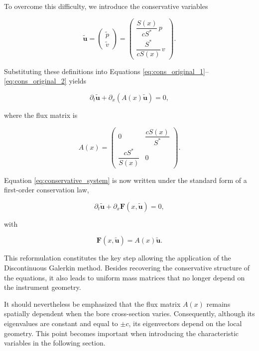 \documentclass[11pt,a4paper]{report}
\theoremstyle{plain}
\theoremstyle{definition}
\begin{document}
To overcome this difficulty, we introduce the conservative variables

\begin{equation}
\tilde{\mathbf{u}}
=
\begin{pmatrix}
\tilde p \\
\tilde v
\end{pmatrix}
=
\begin{pmatrix}
\dfrac{S(x)}{cS^\ast}\,p \\
\dfrac{S^\ast}{cS(x)}\,v
\end{pmatrix}.
\label{eq:conservative_variables}
\end{equation}

Substituting these definitions into Equations
\eqref{eq:cons_original_1}--\eqref{eq:cons_original_2} yields

\begin{equation}
\partial_t \tilde{\mathbf{u}}
+
\partial_x
\left(
A(x)\tilde{\mathbf{u}}
\right)
=
0,
\label{eq:conservative_system}
\end{equation}

where the flux matrix is

\begin{equation}
A(x)
=
\begin{pmatrix}
0 &
\dfrac{cS(x)}{S^\ast}
\\[0.4em]
\dfrac{cS^\ast}{S(x)}
&
0
\end{pmatrix}.
\label{eq:flux_matrix}
\end{equation}

Equation \eqref{eq:conservative_system} is now written under the standard form
of a first-order conservation law,

\begin{equation}
\partial_t\tilde{\mathbf u}
+
\partial_x
\mathbf F(x,\tilde{\mathbf u})
=
0,
\end{equation}

with

\begin{equation}
\mathbf F(x,\tilde{\mathbf u})
=
A(x)\tilde{\mathbf u}.
\end{equation}

This reformulation constitutes the key step allowing the application of the
Discontinuous Galerkin method. Besides recovering the conservative structure of
the equations, it also leads to uniform mass matrices that no longer depend on
the instrument geometry.

It should nevertheless be emphasized that the flux matrix \(A(x)\) remains
spatially dependent when the bore cross-section varies. Consequently, although
its eigenvalues are constant and equal to \(\pm c\), its eigenvectors depend on
the local geometry. This point becomes important when introducing the
characteristic variables in the following section.
\end{document}
